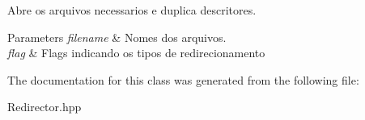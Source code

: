 Abre os arquivos necessarios e duplica descritores. 


\begin{DoxyParams}{Parameters}
{\em filename} & Nomes dos arquivos. \\
\hline
{\em flag} & Flags indicando os tipos de redirecionamento \\
\hline
\end{DoxyParams}


The documentation for this class was generated from the following file:\begin{DoxyCompactItemize}
\item 
Redirector.hpp\end{DoxyCompactItemize}
